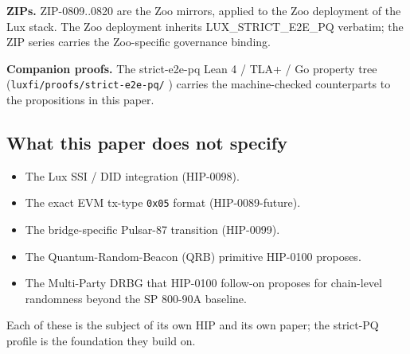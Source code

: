 \textbf{ZIPs.} ZIP-0809..0820 are the Zoo mirrors, applied to the Zoo
deployment of the Lux stack. The Zoo deployment inherits LUX\_STRICT\_E2E\_PQ
verbatim; the ZIP series carries the Zoo-specific governance binding.

\textbf{Companion proofs.} The strict-e2e-pq Lean 4 / TLA+ / Go property
tree (\texttt{luxfi/proofs/strict-e2e-pq/} \cite{luxstricte2epqproofs}) carries
the machine-checked counterparts to the propositions in this paper.

\subsection{What this paper does not specify}

\begin{itemize}[leftmargin=2em,nosep]
  \item The Lux SSI / DID integration (HIP-0098).
  \item The exact EVM tx-type \texttt{0x05} format
    (HIP-0089-future).
  \item The bridge-specific Pulsar-87 transition (HIP-0099).
  \item The Quantum-Random-Beacon (QRB) primitive HIP-0100 proposes.
  \item The Multi-Party DRBG that HIP-0100 follow-on proposes for chain-level
    randomness beyond the SP 800-90A baseline.
\end{itemize}

Each of these is the subject of its own HIP and its own paper; the
strict-PQ profile is the foundation they build on.
